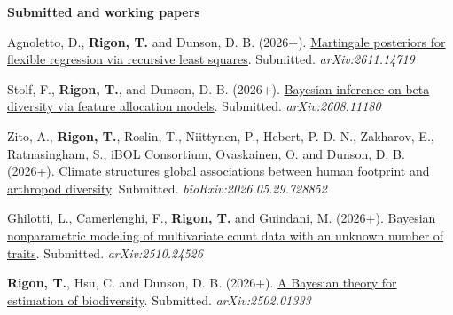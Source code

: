 \documentclass[a4paper,10pt]{article}
\newcommand{\headingfamily}{}
\newif\ifcvfresh\cvfreshfalse
\newcommand{\subhead}[1]{%
  \ifcvfresh\cvfreshfalse\else\par\addvspace{0.4\baselineskip}\fi
  {\headingfamily\bfseries\textcolor{accent}{#1}}\nobreak\par
  \addvspace{0.15\baselineskip}\nobreak}
\begin{document}
\subhead{Submitted and working papers}
\begin{pubs}
\item Agnoletto, D., \textbf{Rigon, T.} and Dunson, D. B. (2026+). \href{https://doi.org/10.48550/arXiv.2611.14719}{Martingale posteriors for flexible regression via recursive least squares}. Submitted. \emph{arXiv:2611.14719}
\item Stolf, F., \textbf{Rigon, T.}, and Dunson, D. B. (2026+). \href{https://doi.org/10.48550/arXiv.2608.11180}{Bayesian inference on beta diversity via feature allocation models}. Submitted. \emph{arXiv:2608.11180}

\item Zito, A., \textbf{Rigon, T.}, Roslin, T., Niittynen, P., Hebert, P. D. N., Zakharov, E., Ratnasingham, S., iBOL Consortium, Ovaskainen, O. and Dunson, D. B. (2026+). \href{https://doi.org/10.64898/2026.05.29.728852}{Climate structures global associations between human footprint and arthropod diversity}. Submitted. \emph{bioRxiv:2026.05.29.728852}
\item Ghilotti, L., Camerlenghi, F., \textbf{Rigon, T.} and Guindani, M. (2026+). \href{https://doi.org/10.48550/arXiv.2510.24526}{Bayesian nonparametric modeling of multivariate count data with an unknown number of traits}. Submitted. \emph{arXiv:2510.24526}
\item \textbf{Rigon, T.}, Hsu, C. and Dunson, D. B. (2026+). \href{https://doi.org/10.48550/arXiv.2502.01333}{A Bayesian theory for estimation of biodiversity}. Submitted. \emph{arXiv:2502.01333}
\end{pubs}
\end{document}
